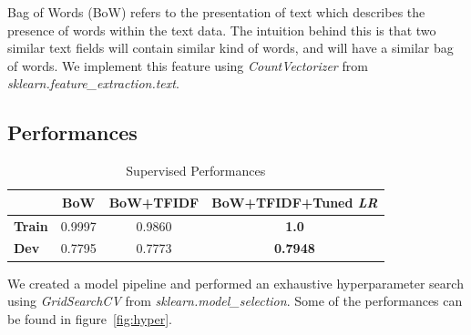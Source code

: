 Bag of Words (BoW) refers to the presentation of text which describes the presence of words within the text data. The intuition behind this is that two similar text fields will contain similar kind of words, and will have a similar bag of words. We implement this feature using \textit{CountVectorizer} from \textit{sklearn.feature\_extraction.text}.


\subsection{\textbf{Performances}}

\begin{table}[ht]  %
\centering  %
\caption{Supervised Performances}
\begin{tabular}{lccc}
\hline
&    \textbf{BoW} & \textbf{BoW+TFIDF} & \textbf{BoW+TFIDF+Tuned \textit{LR}}\\
\hline
 \textbf{Train}   & 0.9997 &  0.9860 &  \textbf{1.0}   \\
 \textbf{Dev} &  0.7795 &  0.7773  &  \textbf{0.7948}   \\
\hline
\end{tabular}
\label{tab:supervised}
\end{table}

We created a model pipeline and performed an exhaustive hyperparameter search using \textit{GridSearchCV} from \textit{sklearn.model\_selection}. Some of the performances can be found in figure~\ref{fig:hyper}.

